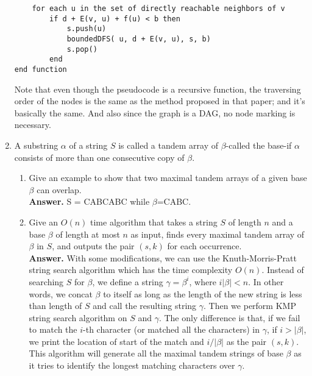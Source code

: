 \documentclass[letterpaper,12pt]{article}
\begin{document}
\begin{enumerate}
\begin{verbatim}
    for each u in the set of directly reachable neighbors of v
        if d + E(v, u) + f(u) < b then
            s.push(u)
            boundedDFS( u, d + E(v, u), s, b)
            s.pop()
        end
end function
\end{verbatim}

Note that even though the pseudocode is a recursive function, the traversing order of the nodes is the same as the method proposed in that paper; and it's basically the same. And also since the graph is a DAG, no node marking is necessary.

\item A substring $\alpha$ of a string $S$ is called a tandem array of $\beta$-called the base-if $\alpha$ consists of more than one consecutive copy of $\beta$.
	\begin{enumerate}
		\item  Give an example to show that two maximal tandem arrays of a given base $\beta$ can overlap.\\
		\textbf{Answer.} S = CABCABC while $\beta$=CABC.
		\item Give an $O(n)$ time algorithm that takes a string $S$ of length $n$ and a base $\beta$ of length at most $n$ as input, finds every maximal tandem array of $\beta$ in $S$, and outputs the pair $(s, k)$ for each occurrence.\\
		\textbf{Answer.} With some modifications, we can use the Knuth-Morris-Pratt string search algorithm which has the time complexity $O(n)$. Instead of searching $S$ for $\beta$, we define a string $\gamma = \beta^i$, where $i|\beta|<n$. In other words, we concat $\beta$ to itself as long as the length of the new string is less than length of $S$ and call the resulting string $\gamma$. Then we perform KMP string search algorithm on $S$ and $\gamma$. The only difference is that, if we fail to match the $i$-th character (or matched all the characters) in $\gamma$, if $i>|\beta|$, we print the location of start of the match and $i/|\beta|$ as the pair $(s, k)$. This algorithm will generate all the maximal tandem strings of base $\beta$ as it tries to identify the longest matching characters over $\gamma$.
	\end{enumerate}


\end{enumerate}
\end{document}
